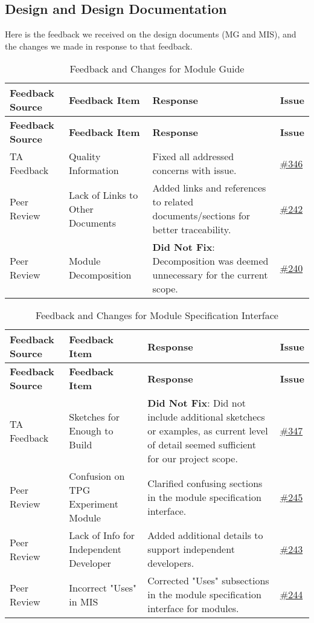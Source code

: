 \documentclass{article}
\begin{document}
\subsection{Design and Design Documentation}
Here is the feedback we received on the design documents (MG and MIS), and the changes we made in response to that feedback.
\begin{longtable}{| p{} | p{} | p{} | p{} |}
    \caption{Feedback and Changes for Module Guide} \\
    \hline
    \textbf{Feedback Source} & \textbf{Feedback Item} & \textbf{Response} & \textbf{Issue} \\
    \hline
    \endfirsthead
    \hline
    \textbf{Feedback Source} & \textbf{Feedback Item} & \textbf{Response} & \textbf{Issue} \\
    \hline
    \endhead
    \hline
    \endfoot
    TA Feedback & Quality Information & Fixed all addressed concerns with issue. & \href{https://github.com/TPGEngine/tpg/issues/346}{\#346} \\
    \hline
    Peer Review & Lack of Links to Other Documents & Added links and references to related documents/sections for better traceability. & \href{https://github.com/TPGEngine/tpg/issues/242}{\#242} \\
    \hline
    Peer Review & Module Decomposition & \textbf{Did Not Fix}: Decomposition was deemed unnecessary for the current scope. & \href{https://github.com/TPGEngine/tpg/issues/240}{\#240} \\
    \hline
\end{longtable}

\begin{longtable}{| p{} | p{} | p{} | p{} |}
    \caption{Feedback and Changes for Module Specification Interface} \\
    \hline
    \textbf{Feedback Source} & \textbf{Feedback Item} & \textbf{Response} & \textbf{Issue} \\
    \hline
    \endfirsthead
    \hline
    \textbf{Feedback Source} & \textbf{Feedback Item} & \textbf{Response} & \textbf{Issue} \\
    \hline
    \endhead
    \hline
    \endfoot
    TA Feedback & Sketches for Enough to Build & \textbf{Did Not Fix}: Did not include additional sketchecs or examples, as current level of detail seemed sufficient for our project scope. & \href{https://github.com/TPGEngine/tpg/issues/347}{\#347} \\
    \hline
    Peer Review & Confusion on TPG Experiment Module & Clarified confusing sections in the module specification interface. & \href{https://github.com/TPGEngine/tpg/issues/245}{\#245} \\
    \hline
    Peer Review & Lack of Info for Independent Developer & Added additional details to support independent developers. & \href{https://github.com/TPGEngine/tpg/issues/243}{\#243} \\
    \hline
    Peer Review & Incorrect "Uses" in MIS & Corrected "Uses" subsections in the module specification interface for modules. & \href{https://github.com/TPGEngine/tpg/issues/244}{\#244} \\
    \hline
\end{longtable}
\end{document}
